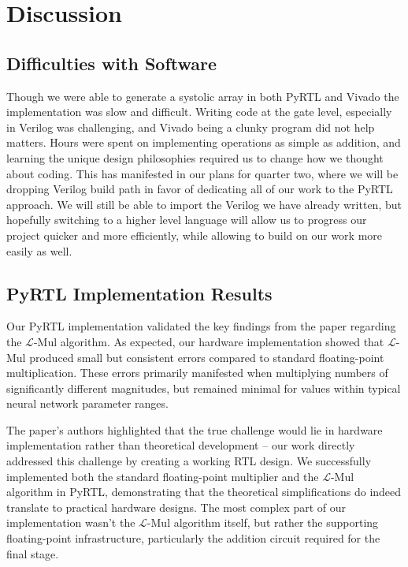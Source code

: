 \documentclass[12pt,letterpaper]{article}
\newcommand{\lmul}{$\mathcal{L}$-Mul\xspace}
\begin{document}
\section{Discussion}

\subsection{Difficulties with Software}
Though we were able to generate a systolic array in both PyRTL and Vivado the implementation was slow and difficult.  Writing code at the gate level, especially in Verilog was challenging, and Vivado being a clunky program did not help matters.  Hours were spent on implementing operations as simple as addition, and learning the unique design philosophies required us to change how we thought about coding.  This has manifested in our plans for quarter two, where we will be dropping Verilog build path in favor of dedicating all of our work to the PyRTL approach.  We will still be able to import the Verilog we have already written, but hopefully switching to a higher level language will allow us to progress our project quicker and more efficiently, while allowing to build on our work more easily as well.

\subsection{PyRTL Implementation Results}

Our PyRTL implementation validated the key findings from the \citep{luo2024addition} paper regarding the \lmul algorithm. As expected, our hardware implementation showed that \lmul produced small but consistent errors compared to standard floating-point multiplication. These errors primarily manifested when multiplying numbers of significantly different magnitudes, but remained minimal for values within typical neural network parameter ranges.

The paper's authors highlighted that the true challenge would lie in hardware implementation rather than theoretical development – our work directly addressed this challenge by creating a working RTL design. We successfully implemented both the standard floating-point multiplier and the \lmul algorithm in PyRTL, demonstrating that the theoretical simplifications do indeed translate to practical hardware designs. The most complex part of our implementation wasn't the \lmul algorithm itself, but rather the supporting floating-point infrastructure, particularly the addition circuit required for the final stage.
\end{document}
